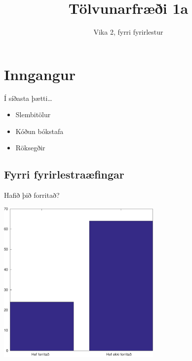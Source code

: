 \documentclass[handout]{beamer}
\title{Tölvunarfræði 1a}
\subtitle{Vika 2, fyrri fyrirlestur}
\begin{document}
\begin{frame}
\titlepage
\end{frame}

\section{Inngangur}

\begin{frame}{Í síðasta þætti\ldots}
\begin{itemize}
 \item Slembitölur
 \item Kóðun bókstafa
 \item Röksegðir
\end{itemize}
\end{frame}

\subsection{Fyrri fyrirlestraæfingar}

\begin{frame}{Hafið þið forritað?}
\begin{center}
\includegraphics[width=0.6\textwidth]{Pics/forritunarreynsla}
\end{center}
\end{frame}
\end{document}
